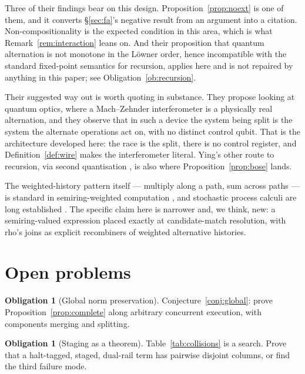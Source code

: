 \documentclass[11pt,a4paper]{article}
\theoremstyle{plain}
\theoremstyle{definition}
\newtheorem{obligation}[theorem]{Obligation}
\theoremstyle{remark}
\begin{document}
Three of their findings bear on this design. Proposition~\ref{prop:noext} is one
of them, and it converts \S\ref{sec:fa}'s negative result from an argument into
a citation. Non-compositionality is the expected condition in this area, which
is what Remark~\ref{rem:interaction} leans on. And their proposition that
quantum alternation is not monotone in the Löwner order, hence incompatible with
the standard fixed-point semantics for recursion, applies here and is not
repaired by anything in this paper; see Obligation~\ref{ob:recursion}.

Their suggested way out is worth quoting in substance. They propose looking at
quantum optics, where a Mach--Zehnder interferometer is a physically real
alternation, and they observe that in such a device the system being split is
the system the alternate operations act on, with no distinct control qubit. That
is the architecture developed here: the race is the split, there is no control
register, and Definition~\ref{def:wire} makes the interferometer literal. Ying's
other route to recursion, via second quantisation \cite{YingSecondQ}, is also
where Proposition~\ref{prop:bose} lands.

The weighted-history pattern itself --- multiply along a path, sum across paths
--- is standard in semiring-weighted computation \cite{DrosteKuichVogler}, and
stochastic process calculi are long established \cite{Priami,SPiM}. The specific
claim here is narrower and, we think, new: a semiring-valued expression placed
exactly at candidate-match resolution, with rho's joins as explicit recombiners
of weighted alternative histories.

\section{Open problems}\label{sec:open}

\begin{obligation}[Global norm preservation]\label{ob:global}
Conjecture~\ref{conj:global}: prove Proposition~\ref{prop:complete} along
arbitrary concurrent execution, with components merging and splitting.
\end{obligation}

\begin{obligation}[Staging as a theorem]\label{ob:staging}
Table~\ref{tab:collisions} is a search. Prove that a halt-tagged, staged,
dual-rail term has pairwise disjoint columns, or find the third failure mode.
\end{obligation}
\end{document}
